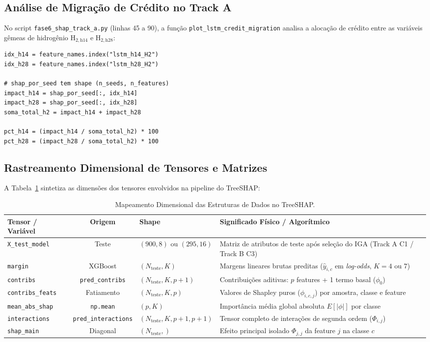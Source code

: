 \documentclass[11pt,a4paper]{article}
\begin{document}
\subsection{Análise de Migração de Crédito no Track A}

No script \texttt{fase6\_shap\_track\_a.py} (linhas 45 a 90), a função \texttt{plot\_lstm\_credit\_migration} analisa a alocação de crédito entre as variáveis gêmeas de hidrogênio $\text{H}_{2, \text{h14}}$ e $\text{H}_{2, \text{h28}}$:

\begin{lstlisting}
idx_h14 = feature_names.index("lstm_h14_H2")
idx_h28 = feature_names.index("lstm_h28_H2")

# shap_por_seed tem shape (n_seeds, n_features)
impact_h14 = shap_por_seed[:, idx_h14]
impact_h28 = shap_por_seed[:, idx_h28]
soma_total_h2 = impact_h14 + impact_h28

pct_h14 = (impact_h14 / soma_total_h2) * 100
pct_h28 = (impact_h28 / soma_total_h2) * 100
\end{lstlisting}

\subsection{Rastreamento Dimensional de Tensores e Matrizes}

A Tabela~\ref{tab:shapes_shap} sintetiza as dimensões dos tensores envolvidos na pipeline do TreeSHAP:

\begin{table}[H]
\centering
\caption{Mapeamento Dimensional das Estruturas de Dados no TreeSHAP.}
\label{tab:shapes_shap}
\small
\begin{tabularx}{\textwidth}{lcp{3.5cm}X}
\toprule
\textbf{Tensor / Variável} & \textbf{Origem} & \textbf{Shape} & \textbf{Significado Físico / Algorítmico} \\
\midrule
\texttt{X\_test\_model} & Teste & $(900, 8)$ ou $(295, 16)$ & Matriz de atributos de teste após seleção do IGA (Track A C1 / Track B C3) \\
\texttt{margin} & XGBoost & $(N_{\text{teste}}, K)$ & Margens lineares brutas preditas ($\hat{y}_{i, c}$ em \textit{log-odds}, $K=4$ ou $7$) \\
\texttt{contribs} & \texttt{pred\_contribs} & $(N_{\text{teste}}, K, p + 1)$ & Contribuições aditivas: $p$ features + 1 termo basal ($\phi_0$) \\
\texttt{contribs\_feats} & Fatiamento & $(N_{\text{teste}}, K, p)$ & Valores de Shapley puros ($\phi_{i, c, j}$) por amostra, classe e feature \\
\texttt{mean\_abs\_shap} & \texttt{np.mean} & $(p, K)$ & Importância média global absoluta $E[|\phi|]$ por classe \\
\texttt{interactions} & \texttt{pred\_interactions} & $(N_{\text{teste}}, K, p+1, p+1)$ & Tensor completo de interações de segunda ordem ($\Phi_{i, j}$) \\
\texttt{shap\_main} & Diagonal & $(N_{\text{teste}},)$ & Efeito principal isolado $\Phi_{j, j}$ da feature $j$ na classe $c$ \\
\bottomrule
\end{tabularx}
\end{table}
\end{document}
